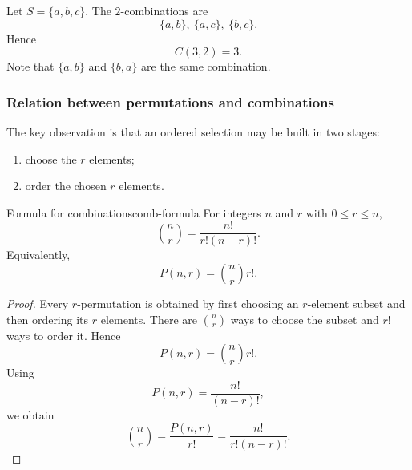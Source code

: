\begin{examplebox}[title={A first example}]
Let $S=\{a,b,c\}$. The $2$-combinations are
\[
\{a,b\},\ \{a,c\},\ \{b,c\}.
\]
Hence
\[
C(3,2)=3.
\]
Note that $\{a,b\}$ and $\{b,a\}$ are the same combination.
\end{examplebox}

\subsubsection{Relation between permutations and combinations}

The key observation is that an ordered selection may be built in two stages:
\begin{enumerate}[leftmargin=*]
    \item choose the $r$ elements;
    \item order the chosen $r$ elements.
\end{enumerate}

\begin{center}
\end{center}

\begin{theorem}{Formula for combinations}{comb-formula}
For integers $n$ and $r$ with $0\le r\le n$,
\[
\binom{n}{r}=\frac{n!}{r!(n-r)!}.
\]
Equivalently,
\[
P(n,r)=\binom{n}{r}r!.
\]
\end{theorem}

\begin{proof}
Every $r$-permutation is obtained by first choosing an $r$-element subset and then ordering its $r$ elements. There are $\binom{n}{r}$ ways to choose the subset and $r!$ ways to order it. Hence
\[
P(n,r)=\binom{n}{r}r!.
\]
Using
\[
P(n,r)=\frac{n!}{(n-r)!},
\]
we obtain
\[
\binom{n}{r}=\frac{P(n,r)}{r!}=\frac{n!}{r!(n-r)!}.
\]
\end{proof}

